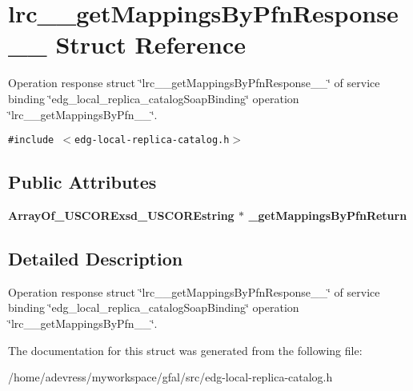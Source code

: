 \section{lrc\_\-\_\-get\-Mappings\-By\-Pfn\-Response\_\-\_\- Struct Reference}
\label{structlrc____getMappingsByPfnResponse____}
Operation response struct \char`\"{}lrc\_\-\_\-get\-Mappings\-By\-Pfn\-Response\_\-\_\-\char`\"{} of service binding \char`\"{}edg\_\-local\_\-replica\_\-catalog\-Soap\-Binding\char`\"{} operation \char`\"{}lrc\_\-\_\-get\-Mappings\-By\-Pfn\_\-\_\-\char`\"{}.  


{\tt \#include $<$edg-local-replica-catalog.h$>$}

\subsection*{Public Attributes}
\begin{CompactItemize}
\item 
\bf{Array\-Of\_\-USCORExsd\_\-USCOREstring} $\ast$ \textbf{\_\-get\-Mappings\-By\-Pfn\-Return}\label{structlrc____getMappingsByPfnResponse_____203e57d8a29975d4d6e2eaf78401c3b6}

\end{CompactItemize}


\subsection{Detailed Description}
Operation response struct \char`\"{}lrc\_\-\_\-get\-Mappings\-By\-Pfn\-Response\_\-\_\-\char`\"{} of service binding \char`\"{}edg\_\-local\_\-replica\_\-catalog\-Soap\-Binding\char`\"{} operation \char`\"{}lrc\_\-\_\-get\-Mappings\-By\-Pfn\_\-\_\-\char`\"{}. 



The documentation for this struct was generated from the following file:\begin{CompactItemize}
\item 
/home/adevress/myworkspace/gfal/src/edg-local-replica-catalog.h\end{CompactItemize}
